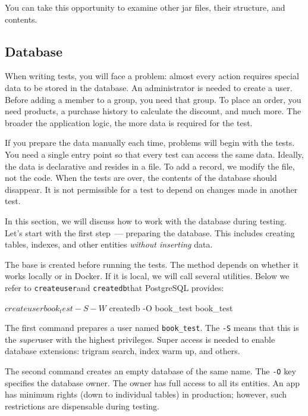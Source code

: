 You can take this opportunity to examine other jar files, their structure, and contents.

\subsection{Database}


When writing tests, you will face a problem: almost every action requires special data to be stored in the database. An administrator is needed to create a user. Before adding a member to a group, you need that group. To place an order, you need products, a purchase history to calculate the discount, and much more. The broader the application logic, the more data is required for the test.

If you prepare the data manually each time, problems will begin with the tests. You need a single entry point so that every test can access the same data. Ideally, the data is declarative and resides in a file. To add a record, we modify the file, not the code. When the tests are over, the contents of the database should disappear. It is not permissible for a test to depend on changes made in another test.

In this section, we will discuss how to work with the database during testing. Let's start with the first step~--- preparing the database. This includes creating tables, indexes, and other entities \emph{without inserting} data.


The base is created before running the tests. The method depends on whether it works locally or in Docker. If it is local, we will call several utilities. Below we refer to \verb|createuser|and \verb|createdb|that PostgreSQL provides:

\begin{english}
  \begin{bash}
$ createuser book_test -S -W
$ createdb -O book_test book_test
  \end{bash}
\end{english}

The first command prepares a user named \verb|book_test|. The \verb|-S| means that this is the \emph{super}user with the highest privileges. Super access is needed to enable database extensions: trigram search, index warm up, and others.

The second command creates an empty database of the same name. The \verb|-O| key specifies the database owner. The owner has full access to all its entities. An app has minimum rights (down to individual tables) in production; however, such restrictions are dispensable during testing.

